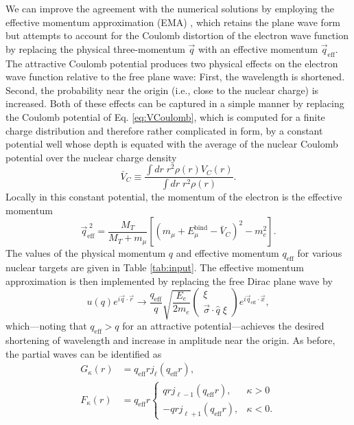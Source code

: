 \documentclass{book}[letterpaper,12pt]
\begin{document}
We can improve the agreement with the numerical solutions by employing the effective momentum approximation (EMA) \cite{KNOLL1974462,LENZ1971513}, which retains the plane wave form but attempts to account for the Coulomb distortion of the electron wave function by replacing the physical three-momentum $\vec{q}$ with an effective momentum $\vec{q}_\mathrm{eff}$. The attractive Coulomb potential produces two physical effects on the electron wave function relative to the free plane wave: First, the wavelength is shortened. Second, the probability near the origin (i.e., close to the nuclear charge) is increased. Both of these effects can be captured in a simple manner by replacing the Coulomb potential of Eq. \ref{eq:VCoulomb}, which is computed for a finite charge distribution and therefore rather complicated in form, by a constant potential well whose depth is equated with the average of the nuclear Coulomb potential over the nuclear charge density
\begin{equation}
\bar{V}_C\equiv \frac{\int dr \;r^2 \rho(r) V_C(r)}{\int dr \;r^2 \rho(r)}.
\end{equation}
Locally in this constant potential, the momentum of the electron is the effective momentum
\begin{equation}
\vec{q}_\mathrm{eff}^{\;2}=\frac{M_T}{M_T+m_{\mu}}\left[\left(m_{\mu}+E_{\mu}^\mathrm{bind}-\bar{V}_C\right)^2-m_e^2\right].
\end{equation}
The values of the physical momentum $q$ and effective momentum $q_\mathrm{eff}$ for various nuclear targets are given in Table \ref{tab:input}. The effective momentum approximation is then implemented by replacing the free Dirac plane wave by 
\begin{equation}
u(q)e^{i\vec{q}\cdot\vec{r}}\rightarrow\frac{q_\mathrm{eff}}{q}\sqrt{\frac{E_e}{2m_e}}\left(\begin{array}{c}
\xi\\
\vec{\sigma}\cdot\hat{q}\;\xi
\end{array}\right)
e^{i\vec{q}_\mathrm{eff}\cdot\vec{x}},
\end{equation}
which---noting that $q_\mathrm{eff}>q$ for an attractive potential---achieves the desired shortening of wavelength and increase in amplitude near the origin. As before, the partial waves can be identified as
\begin{equation}
\begin{split}
G_{\kappa}(r)&=q_\mathrm{eff}rj_{\ell}(q_\mathrm{eff}r),\\
F_{\kappa}(r)&=q_\mathrm{eff}r\left\{\begin{array}{cc}
qrj_{\ell-1}(q_\mathrm{eff}r), & \kappa>0\\
-qrj_{\ell+1}(q_\mathrm{eff}r), &\kappa < 0.
\end{array}\right. 
\end{split}
\label{eq:ema_bessel}
\end{equation}
\end{document}
